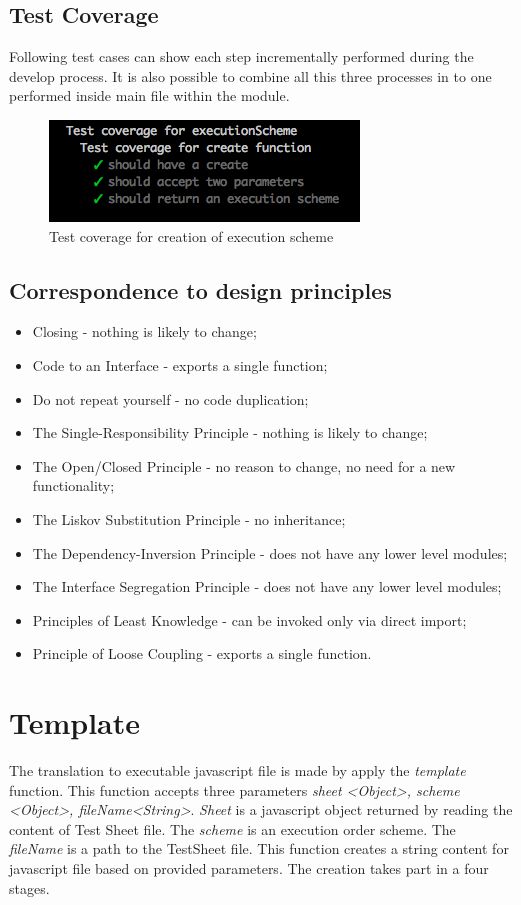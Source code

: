 \subsection{Test Coverage}
Following test cases can show each step incrementally performed during the develop process. It is also possible to combine all this three processes in to one performed inside main file within the module.
\begin{figure}[H]
	\centering
	\includegraphics[width=\linewidth]{grafiken/testCreate.png}
	\caption{Test coverage for creation of execution scheme}
	\label{fig:testCreate}
\end{figure}

\subsection{Correspondence to design principles}
\begin{itemize}
	\item Closing - nothing is likely to change;
	\item Code to an Interface - exports a single function;
	\item Do not repeat yourself - no code duplication;
	\item The Single-Responsibility Principle - nothing is likely to change;
	\item The Open/Closed Principle - no reason to change, no need for a new functionality;
	\item The Liskov Substitution Principle - no inheritance;
	\item The Dependency-Inversion Principle - does not have any lower level modules;
	\item The Interface Segregation Principle - does not have any lower level modules;
	\item Principles of Least Knowledge -  can be invoked only via direct import;
	\item Principle of Loose Coupling - exports a single function.
\end{itemize}

\section{Template}
\label{sec:template}
The translation to executable javascript file is made by apply the \textit{template} function. This function accepts three parameters \textit{sheet <Object>, scheme <Object>, fileName<String>}. \textit{Sheet} is a javascript object returned by reading the content of Test Sheet file. The \textit{scheme} is an execution order scheme. The \textit{fileName} is a path to the TestSheet file. This function creates a string content for javascript file based on provided parameters. The creation takes part in a four stages. 


